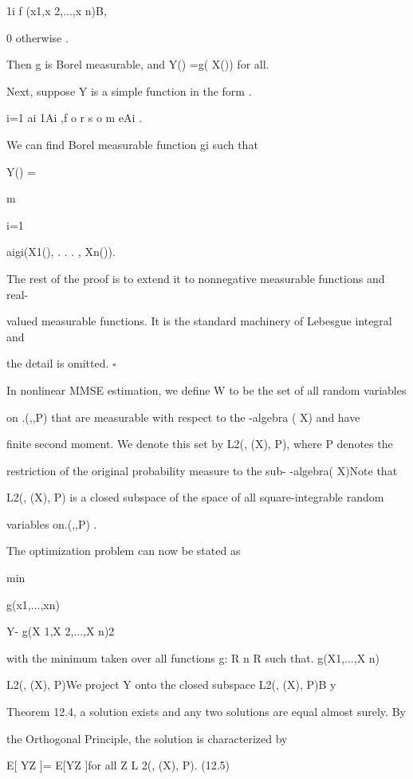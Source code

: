 {

1i f (x1,x 2,...,x n)\in B,

0 otherwise .

Then g is Borel measurable, and Y() =g( X()) for all\in \Omega .

Next, suppose Y is a simple function in the form .

\summ

i=1 ai 1Ai ,f o r s o m eAi \in{}.

We can find Borel measurable function gi such that

Y() =

m\sum

i=1

aigi(X1(), . . . , Xn()).

The rest of the proof is to extend it to nonnegative measurable functions and real-

valued measurable functions. It is the standard machinery of Lebesgue integral and

the detail is omitted. \hfill $\square$

In nonlinear MMSE estimation, we define W to be the set of all random variables

on .(\Omega,,P) that are measurable with respect to the \sigma-algebra \sigma( X) and have

finite second moment. We denote this set by L2(\Omega, \sigma(X), P), where P denotes the

restriction of the original probability measure to the sub- \sigma-algebra\sigma( X)Note that

L2(\Omega, \sigma(X), P) is a closed subspace of the space of all square-integrable random

variables on.(\Omega,,P) .

The optimization problem can now be stated as

min

g(x1,...,xn)

Y- g(X 1,X 2,...,X n)2

with the minimum taken over all functions g: R n \to R such that. g(X1,...,X n)\in

L2(\Omega, \sigma(X), P)We project Y onto the closed subspace L2(\Omega, \sigma(X), P)B y

Theorem 12.4, a solution exists and any two solutions are equal almost surely. By

the Orthogonal Principle, the solution is characterized by

E[ YZ ]= E[YZ ]for all Z \in L 2(\Omega, \sigma(X), P). (12.5)

}
